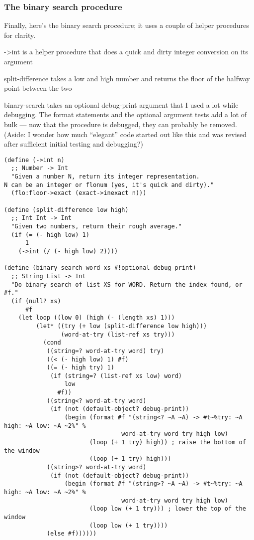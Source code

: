 \documentclass[12pt,openright,draft]{book}
\begin{document}
\subsubsection{The binary search procedure}

Finally, here's the binary search procedure; it uses a couple of
helper procedures for clarity.

->int is a helper procedure that does a quick and dirty integer
conversion on its argument

split-difference takes a low and high number and returns the floor of
the halfway point between the two

binary-search takes an optional debug-print argument that I used a lot
while debugging. The format statements and the optional argument tests
add a lot of bulk --- now that the procedure is debugged, they can
probably be removed. (Aside: I wonder how much ``elegant'' code
started out like this and was revised after sufficient initial testing
and debugging?)

\begin{verbatim}
(define (->int n)
  ;; Number -> Int
  "Given a number N, return its integer representation.
N can be an integer or flonum (yes, it's quick and dirty)."
  (flo:floor->exact (exact->inexact n)))

(define (split-difference low high)
  ;; Int Int -> Int
  "Given two numbers, return their rough average."
  (if (= (- high low) 1)
      1
    (->int (/ (- high low) 2))))

(define (binary-search word xs #!optional debug-print)
  ;; String List -> Int
  "Do binary search of list XS for WORD. Return the index found, or #f."
  (if (null? xs)
      #f
    (let loop ((low 0) (high (- (length xs) 1)))
         (let* ((try (+ low (split-difference low high)))
                (word-at-try (list-ref xs try)))
           (cond
            ((string=? word-at-try word) try)
            ((< (- high low) 1) #f)
            ((= (- high try) 1) 
             (if (string=? (list-ref xs low) word)
                 low
               #f))
            ((string<? word-at-try word)
             (if (not (default-object? debug-print))
                 (begin (format #f "(string<? ~A ~A) -> #t~%try: ~A high: ~A low: ~A ~2%" %
                                 word-at-try word try high low)
                        (loop (+ 1 try) high)) ; raise the bottom of the window
                        (loop (+ 1 try) high)))
            ((string>? word-at-try word)
             (if (not (default-object? debug-print))
                 (begin (format #f "(string>? ~A ~A) -> #t~%try: ~A high: ~A low: ~A ~2%" %
                                 word-at-try word try high low)
                        (loop low (+ 1 try))) ; lower the top of the window
                        (loop low (+ 1 try))))
            (else #f))))))
\end{verbatim}
\end{document}
